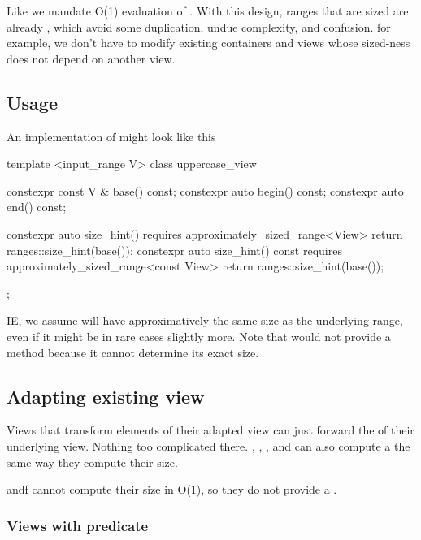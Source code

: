 \documentclass{wg21}
\begin{document}
Like  we mandate O(1) evaluation of .
With this design, ranges that are sized are already , which avoid some duplication, undue complexity, and confusion.
for example, we don't have to modify existing containers and views whose sized-ness does not depend on another view.

\subsection{Usage}

An implementation of  might look like this

\begin{colorblock}
template <input_range V>
class uppercase_view {
    constexpr const V & base() const;
    constexpr auto begin() const;
    constexpr auto end() const;

    constexpr auto size_hint() requires approximately_sized_range<View> {
        return ranges::size_hint(base());
    }
    constexpr auto size_hint() const requires approximately_sized_range<const View> {
        return ranges::size_hint(base());
    }
};
\end{colorblock}

IE, we assume  will have approximatively the same size as the underlying range, even if it might be in rare cases slightly more.
Note that  would not provide a  method because it cannot determine its exact size.

\subsection{Adapting existing view}

Views that transform elements of their adapted view can just forward the  of their underlying view.
Nothing too complicated there. , ,  ,  and  can also
compute a  the same way they compute their size.

 andf  cannot compute their size in O(1), so they do not provide a .

\subsubsection{Views with predicate}
\end{document}
